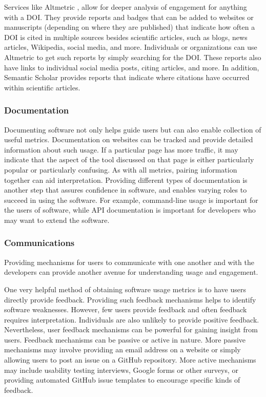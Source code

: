 \documentclass{article}
\begin{document}
Services like Altmetric \cite{noauthor_altmetric_2015}, allow for deeper analysis of engagement for anything with a DOI. They provide reports and badges that can be added to websites or manuscripts (depending on where they are published) that indicate how often a DOI is cited in multiple sources besides scientific articles, such as blogs, news articles, Wikipedia, social media, and more.  Individuals or organizations can use Altmetric to get such reports by simply searching for the DOI. These reports also have links to individual social media posts, citing articles, and more. In addition, Semantic Scholar \cite{noauthor_semantic_nodate} provides reports that indicate where citations have occurred within scientific articles. 


\subsubsection{Documentation}
Documenting software not only helps guide users but can also enable collection of useful metrics.  Documentation on websites can be tracked and provide detailed information about such usage. If a particular page has more traffic, it may indicate that the aspect of the tool discussed on that page is either particularly popular or particularly confusing. As with all metrics, pairing information together can aid interpretation. Providing different types of documentation is another step that assures confidence in software, and enables varying roles to succeed in using the software. For example, command-line usage is important for the users of software, while API documentation is important for developers who may want to extend the software.

\subsubsection{Communications} 
Providing mechanisms for users to communicate with one another and with the developers can provide another avenue for understanding usage and engagement.


One very helpful method of obtaining software usage metrics is to have users directly provide feedback. Providing such feedback mechanisms helps to identify software weaknesses. However, few users provide feedback and often feedback requires interpretation. Individuals are also unlikely to provide positive feedback. Nevertheless, user feedback mechanisms can be powerful for gaining insight from users. 
Feedback mechanisms can be passive or active in nature. More passive mechanisms may involve providing an email address on a website or simply allowing users to post an issue on a GitHub repository. More active mechanisms may include usability testing interviews, Google forms or other surveys, or providing automated GitHub issue templates to encourage specific kinds of feedback.
\end{document}
